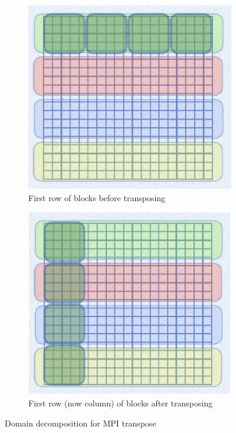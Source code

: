 \documentclass[a4paper]{article}
\begin{document}
\begin{figure}
	\centering
	\begin{subfigure}{0.45\textwidth}
		\includegraphics[width=\textwidth]{domain_decomposition_transpose.png}
		\caption{First row of blocks before transposing}
		\label{fig:domain-decomp-block-before}
	\end{subfigure}
	\quad
	\begin{subfigure}{0.45\textwidth}
		\includegraphics[width=\textwidth]{domain_decomposition_transpose_after.png}
		\caption{First row (now column) of blocks after transposing}
		\label{fig:domain-decomp-block-after}
	\end{subfigure}
	\caption{Domain decomposition for MPI transpose\protect\footnotemark}
	\label{fig:domain-decomp-block}
\end{figure}
\end{document}
